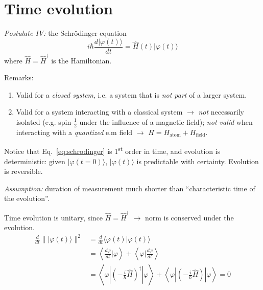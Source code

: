 \documentclass[12pt]{article}
\begin{document}
\section{Time evolution}

\emph{Postulate IV:} the Schrödinger equation
\begin{equation}
\boxed{
i \hbar \frac{d|\varphi(t)\rangle}{d t} = 
\hat{H}(t) |\varphi(t)\rangle
}
\label{eq:schrodinger}
\end{equation}
where $\hat{H} = \hat{H}^{\dagger}$ is the Hamiltonian.

Remarks:
\begin{enumerate}
\item Valid for a \emph{closed system}, i.e. a system that is \emph{not part} of a larger system.
\item Valid for a system interacting with a classical 
system $\to$ \emph{not} necessarily isolated (e.g. spin-$\frac{1}{2}$
under the influence of a magnetic field);
\emph{not valid} when interacting with a \emph{quantized}
e.m field $\to$ $H = H_\textrm{atom} + H_\textrm{field}$. 
\end{enumerate}

Notice that Eq.~\eqref{eq:schrodinger} is 1\textsuperscript{st} order in time, and evolution is deterministic: given \mbox{$|\varphi(t=0)\rangle$}, $|\varphi(t)\rangle$ is predictable with certainty. Evolution is reversible.

\bigskip

\emph{Assumption:} duration of measurement much shorter
than ``characteristic time of the evolution''.

Time evolution is unitary, since $\hat{H} = \hat{H}^{\dagger}$ $\to$ norm is conserved under the evolution.
\begin{equation}
\begin{aligned} \frac{d}{d t} \||\varphi(t)\rangle \|^{2} &=\frac{d}{d t}\langle\varphi(t) | \varphi(t)\rangle \\ &=\left\langle\frac{d \varphi}{d t} | \varphi\right\rangle+\left\langle\varphi | \frac{d \varphi}{d t}\right\rangle\\
&=\left\langle\varphi \left|\left(-\frac{i}{\hbar} \hat{H}\right)^{\dagger}\right|\varphi\right\rangle+\left\langle\varphi\left|\left(-\frac{i}{\hbar} \hat{H}\right)\right| \varphi\right\rangle
=0
\end{aligned}
\end{equation}
\end{document}
